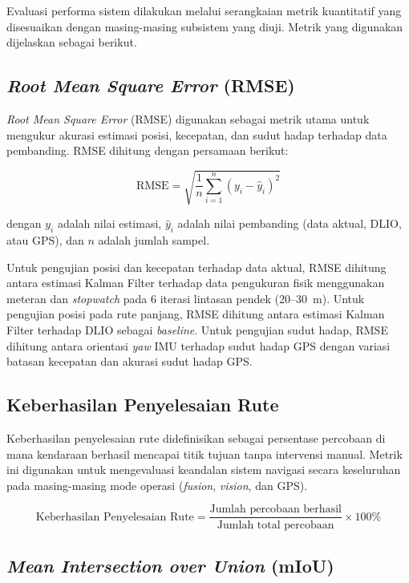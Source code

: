 Evaluasi performa sistem dilakukan melalui serangkaian metrik kuantitatif yang disesuaikan dengan masing-masing subsistem yang diuji. Metrik yang digunakan dijelaskan sebagai berikut.

\subsection{\emph{Root Mean Square Error} (RMSE)}

\emph{Root Mean Square Error} (RMSE) digunakan sebagai metrik utama untuk mengukur akurasi estimasi posisi, kecepatan, dan sudut hadap terhadap data pembanding. RMSE dihitung dengan persamaan berikut:

\begin{equation}
\text{RMSE} = \sqrt{\frac{1}{n}\sum_{i=1}^{n}(y_i - \hat{y}_i)^2}
\label{eq:rmse}
\end{equation}

dengan $y_i$ adalah nilai estimasi, $\hat{y}_i$ adalah nilai pembanding (data aktual, DLIO, atau GPS), dan $n$ adalah jumlah sampel.

Untuk pengujian posisi dan kecepatan terhadap data aktual, RMSE dihitung antara estimasi Kalman Filter terhadap data pengukuran fisik menggunakan meteran dan \emph{stopwatch} pada 6 iterasi lintasan pendek (20--30~m).
Untuk pengujian posisi pada rute panjang, RMSE dihitung antara estimasi Kalman Filter terhadap DLIO sebagai \emph{baseline}.
Untuk pengujian sudut hadap, RMSE dihitung antara orientasi \emph{yaw} IMU terhadap sudut hadap GPS dengan variasi batasan kecepatan dan akurasi sudut hadap GPS.

\subsection{Keberhasilan Penyelesaian Rute}

Keberhasilan penyelesaian rute didefinisikan sebagai persentase percobaan di mana kendaraan berhasil mencapai titik tujuan tanpa intervensi manual.
Metrik ini digunakan untuk mengevaluasi keandalan sistem navigasi secara keseluruhan pada masing-masing mode operasi (\emph{fusion}, \emph{vision}, dan GPS).

\begin{equation}
\text{Keberhasilan Penyelesaian Rute} = \frac{\text{Jumlah percobaan berhasil}}{\text{Jumlah total percobaan}} \times 100\%
\label{eq:completion_rate}
\end{equation}

\subsection{\emph{Mean Intersection over Union} (mIoU)}

